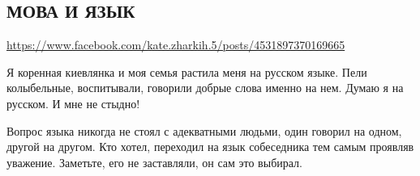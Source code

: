  
 
 
 
 

\subsection{МОВА И ЯЗЫК}
\url{https://www.facebook.com/kate.zharkih.5/posts/4531897370169665}

Я коренная киевлянка и моя семья растила меня на русском языке. Пели
колыбельные, воспитывали, говорили добрые слова именно на нем. Думаю я на
русском. И мне не стыдно!

Вопрос языка никогда не стоял с адекватными людьми, один говорил на одном,
другой на другом. Кто хотел, переходил на язык собеседника тем самым проявляв
уважение. Заметьте, его не заставляли, он сам это выбирал.

